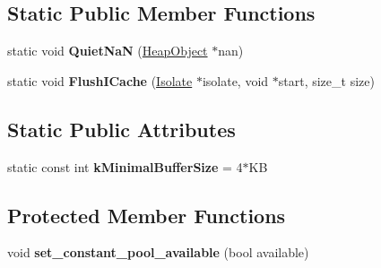 \subsection*{Static Public Member Functions}
\begin{DoxyCompactItemize}
\item 
static void {\bfseries Quiet\+NaN} (\hyperlink{classv8_1_1internal_1_1_heap_object}{Heap\+Object} $\ast$nan)\hypertarget{classv8_1_1internal_1_1_assembler_base_a11f5cc896549fe763ac528492f16111e}{}\label{classv8_1_1internal_1_1_assembler_base_a11f5cc896549fe763ac528492f16111e}

\item 
static void {\bfseries Flush\+I\+Cache} (\hyperlink{classv8_1_1internal_1_1_isolate}{Isolate} $\ast$isolate, void $\ast$start, size\+\_\+t size)\hypertarget{classv8_1_1internal_1_1_assembler_base_ac2c098aeb17d412bf319f2e086ac0785}{}\label{classv8_1_1internal_1_1_assembler_base_ac2c098aeb17d412bf319f2e086ac0785}

\end{DoxyCompactItemize}
\subsection*{Static Public Attributes}
\begin{DoxyCompactItemize}
\item 
static const int {\bfseries k\+Minimal\+Buffer\+Size} = 4$\ast$KB\hypertarget{classv8_1_1internal_1_1_assembler_base_a58ac353bfad9e4a1206864e76baec7f8}{}\label{classv8_1_1internal_1_1_assembler_base_a58ac353bfad9e4a1206864e76baec7f8}

\end{DoxyCompactItemize}
\subsection*{Protected Member Functions}
\begin{DoxyCompactItemize}
\item 
void {\bfseries set\+\_\+constant\+\_\+pool\+\_\+available} (bool available)\hypertarget{classv8_1_1internal_1_1_assembler_base_af45536e3cf5df4078e5b8e2b5bb54dba}{}\label{classv8_1_1internal_1_1_assembler_base_af45536e3cf5df4078e5b8e2b5bb54dba}

\end{DoxyCompactItemize}
